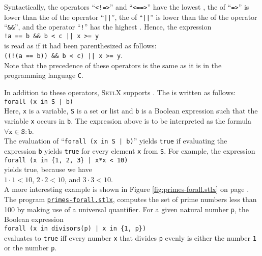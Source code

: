 Syntactically, the operators ``\texttt{<!=>}'' and ``\texttt{<==>}'' have the lowest ,
the  of ``\texttt{=>}'' is lower than the  of the operator
``\texttt{||}'', the  of ``\texttt{||}'' is lower than the  of the operator
``\texttt{\&\&}'', and the operator ``\texttt{!}'' has the highest .  Hence, the expression  
\\[0.2cm]
\hspace*{1.3cm}
\texttt{!a == b \&\& b < c || x >= y}
\\[0.2cm]
is read as if it had been parenthesized as follows:
\\[0.2cm]
\hspace*{1.3cm}
\texttt{((!(a == b)) \&\& b < c) || x >= y}.
\\[0.2cm]
Note that the precedence of these operators is the same as it is in the programming language \texttt{C}.

In addition to these operators, \textsc{SetlX} supports .  The  is
written as follows:
\\[0.2cm]
\hspace*{1.3cm}
\texttt{forall (x in S | b)}
\\[0.2cm]
Here, \texttt{x} is a variable, \texttt{S} is a set or list and \texttt{b} is a Boolean expression such
that the variable \texttt{x} occurs in \texttt{b}.  The expression above is to be interpreted as the formula
\\[0.2cm]
\hspace*{1.3cm}
$\forall \mathtt{x} \in \mathtt{S}: \mathtt{b}$.
\\[0.2cm]
The evaluation of ``\texttt{forall (x in S | b)}'' yields
\texttt{true} if evaluating the expression \texttt{b} yields \texttt{true} for every element \texttt{x} from
\texttt{S}.  For example, the expression
\\[0.2cm]
\hspace*{1.3cm}
\texttt{forall (x in \{1, 2, 3\} | x*x < 10)}
\\[0.2cm]
yields true, because we have
\\[0.2cm]
\hspace*{1.3cm}
$1 \cdot 1 < 10$, \quad $2 \cdot 2 < 10$, \quad and \quad $3 \cdot 3 < 10$.
\\[0.2cm]
A more interesting example is shown in Figure \ref{fig:primes-forall.stlx} on page
\pageref{fig:primes-forall.stlx}.  The program
\href{https://github.com/karlstroetmann/Logik/blob/master/SetlX/primes-forall.stlx}{\texttt{primes-forall.stlx}},
computes the set of prime numbers less than 100 by making use of a universal quantifier.
For a given natural number \texttt{p}, the Boolean expression
\\[0.2cm]
\hspace*{1.3cm}
\texttt{forall (x in divisors(p) | x in \{1, p\})}
\\[0.2cm]
evaluates to \texttt{true} iff every number \texttt{x} that divides \texttt{p} evenly is either the number
\texttt{1} or the number \texttt{p}.


